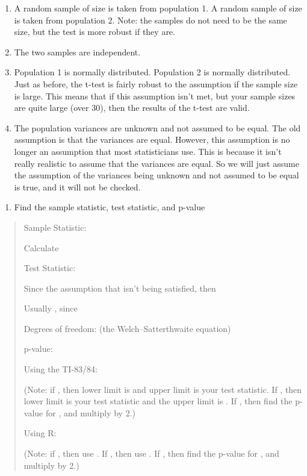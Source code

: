 \documentclass[]{book}
\providecommand{\tightlist}{%
  \setlength{\itemsep}{0pt}\setlength{\parskip}{0pt}}
\begin{document}
\begin{enumerate}
\def\labelenumi{\alph{enumi}.}
\item
  A random sample of size is taken from population 1. A random sample of size is taken from population 2. Note: the samples do not need to be the same size, but the test is more robust if they are.
\item
  The two samples are independent.
\item
  Population 1 is normally distributed. Population 2 is normally distributed. Just as before, the t-test is fairly robust to the assumption if the sample size is large. This means that if this assumption isn't met, but your sample sizes are quite large (over 30), then the results of the t-test are valid.
\item
  The population variances are unknown and not assumed to be equal. The old assumption is that the variances are equal. However, this assumption is no longer an assumption that most statisticians use. This is because it isn't really realistic to assume that the variances are equal. So we will just assume the assumption of the variances being unknown and not assumed to be equal is true, and it will not be checked.
\end{enumerate}

\begin{enumerate}
\def\labelenumi{\arabic{enumi}.}
\setcounter{enumi}{3}
\tightlist
\item
  Find the sample statistic, test statistic, and p-value
\end{enumerate}

\begin{quote}
Sample Statistic:

Calculate

Test Statistic:

Since the assumption that isn't being satisfied, then

Usually , since

Degrees of freedom: (the Welch--Satterthwaite equation)

p-value:

Using the TI-83/84:

(Note: if , then lower limit is and upper limit is your test
statistic. If , then lower limit is your test statistic and the upper
limit is . If , then find the p-value for , and multiply by 2.)

Using R:

(Note: if , then use . If , then use . If , then find the p-value for , and multiply by 2.)
\end{quote}
\end{document}
